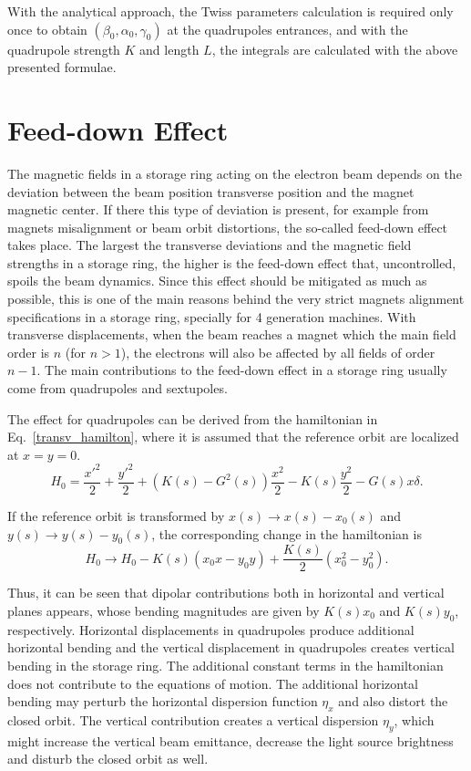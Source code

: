 With the analytical approach, the Twiss parameters calculation is required only once to obtain $(\beta_0, \alpha_0, \gamma_0)$ at the quadrupoles entrances, and with the quadrupole strength $K$ and length $L$, the integrals are calculated with the above presented formulae.

\chapter{Feed-down Effect}\label{appendix:feed-down}
The magnetic fields in a storage ring acting on the electron beam depends on the deviation between the beam position transverse position and the magnet magnetic center. If there this type of deviation is present, for example from magnets misalignment or beam orbit distortions, the so-called feed-down effect takes place. The largest the transverse deviations and the magnetic field strengths in a storage ring, the higher is the feed-down effect that, uncontrolled, spoils the beam dynamics. Since this effect should be mitigated as much as possible, this is one of the main reasons behind the very strict magnets alignment specifications in a storage ring, specially for 4 generation machines. With transverse displacements, when the beam reaches a magnet which the main field order is $n$ (for $n>1$), the electrons will also be affected by all fields of order $n-1$. The main contributions to the feed-down effect in a storage ring usually come from quadrupoles and sextupoles. 

The effect for quadrupoles can be derived from the hamiltonian in Eq.~\eqref{transv_hamilton}, where it is assumed that the reference orbit are localized at $x=y=0$. 
\begin{equation}
    H_0 = \dfrac{{x'}^2}{2} + \dfrac{{y'}^2}{2} + \left(K(s)- G^{2}(s)\right)\dfrac{{x}^2}{2} - K(s) \frac{y^2}{2} - G(s) x \delta.
\end{equation}

If the reference orbit is transformed by $x(s) \rightarrow x(s) - x_0(s)$ and $y(s) \rightarrow y(s) - y_0(s)$, the corresponding change in the hamiltonian is
\begin{equation}
    H_0 \rightarrow H_0 - K(s)\left(x_0x - y_0y\right) + \dfrac{K(s)}{2}\left(x_0^2 - y_0^2\right).
\end{equation}

Thus, it can be seen that dipolar contributions both in horizontal and vertical planes appears, whose bending magnitudes are given by $K(s)x_0$ and $K(s)y_0$, respectively. Horizontal displacements in quadrupoles produce additional horizontal bending and the vertical displacement in quadrupoles creates vertical bending in the storage ring. The additional constant terms in the hamiltonian does not contribute to the equations of motion. The additional horizontal bending may perturb the horizontal dispersion function $\eta_x$ and also distort the closed orbit. The vertical contribution creates a vertical dispersion $\eta_y$, which might increase the vertical beam emittance, decrease the light source brightness and disturb the closed orbit as well.

